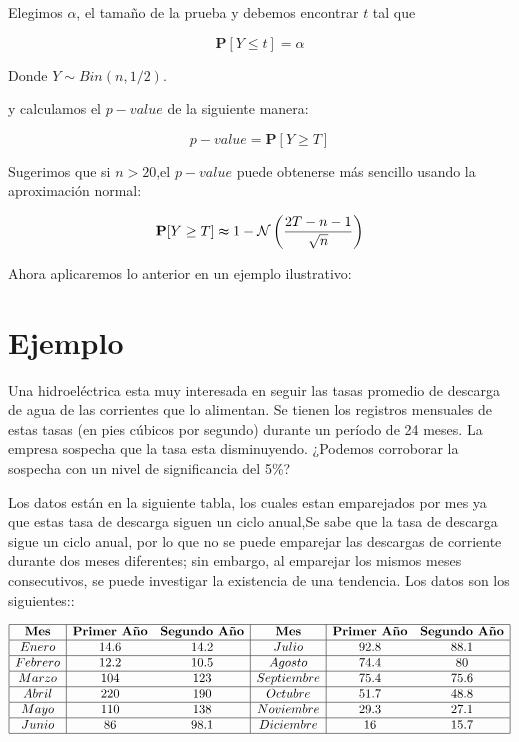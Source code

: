 \documentclass[
  a4paper,
  oneside,
  openany]{book}
\begin{document}
Elegimos \(\alpha\), el tamaño de la prueba y debemos encontrar \(t\) tal que

\[\mathbf{P}[Y \leq t]=\alpha\]

Donde \(Y \sim Bin (n,1/2)\).

y calculamos el \(p-value\) de la siguiente manera:

\[p-value=\mathbf{P}[Y\geq T]\]

Sugerimos que si \(n > 20\),el \(p-value\) puede obtenerse más sencillo usando la aproximación normal:

\[\mathbf{P}[Y\geq T] \thickapprox 1- \mathcal{N} \left(\frac{2T-n-1}{\sqrt{n}}\right)\]

Ahora aplicaremos lo anterior en un ejemplo ilustrativo:

\hypertarget{ejemplo-4}{%
\section{Ejemplo}\label{ejemplo-4}}

Una hidroeléctrica esta muy interesada en seguir las tasas promedio de descarga de agua de las corrientes que lo alimentan. Se tienen los registros mensuales de estas tasas (en pies cúbicos por segundo) durante un período de 24 meses.
La empresa sospecha que la tasa esta disminuyendo. ¿Podemos corroborar la sospecha con un nivel de significancia del 5\%?

Los datos están en la siguiente tabla, los cuales estan emparejados por mes ya que estas tasa de descarga siguen un ciclo anual,Se sabe que la tasa de descarga sigue un ciclo anual, por lo que no se puede emparejar las descargas de corriente durante dos meses diferentes; sin embargo, al emparejar los mismos meses consecutivos, se puede investigar la existencia de una tendencia. Los datos son los siguientes::

\[
\begin{array}{|c| c c|c| c c|} 
\hline
\textbf{Mes} & \textbf{Primer Año} & \textbf{Segundo Año} & \textbf{Mes} & \textbf{Primer Año} & \textbf{Segundo Año}\\
\hline
Enero & 14.6 & 14.2 & Julio & 92.8 & 88.1 \\
\hline
Febrero&12.2&10.5&Agosto&74.4&80 \\
\hline
Marzo&104&123&Septiembre&75.4&75.6 \\
\hline
Abril&220&190&Octubre&51.7&48.8 \\
\hline
Mayo&110&138&Noviembre&29.3&27.1 \\
\hline
Junio&86&98.1&Diciembre&16&15.7 \\
\hline
\end{array}
\]
\end{document}
